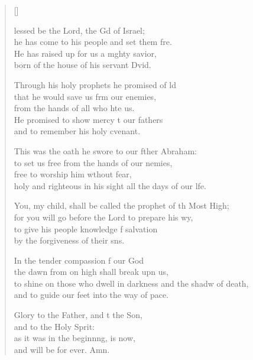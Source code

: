 \settowidth{\versewidth}{to shine on those who dwell in darkness and the shadow of death, *}
\begin{verse}[\versewidth]
  \begin{patverse}
lessed be the Lord, the Gd of Israel;\Med\\
he has come to his people and set them fre.\\
He has raised up for us a m\pointup{\i}ghty savior,\Med\\
born of the house of his servant Dvid.

Through his holy prophets he promised of ld\Flex\\
that he would save us frm our enemies,\Med\\
from the hands of all who hte us.\\
He promised to show mercy t our fathers\Med\\
and to remember his holy cvenant.

This was the oath he swore to our fther Abraham:\Med\\
to set us free from the hands of our nemies,\\
free to worship him w\pointup{\i}thout fear,\Med\\
holy and righteous in his sight all the days of our l\pointup{\i}fe.

You, my child, shall be called the prophet of th Most High;\Med\\
for you will go before the Lord to prepare his wy,\\
to give his people knowledge f salvation\Med\\
by the forgiveness of their s\pointup{\i}ns.

In the tender compassion f our God\Med\\
the dawn from on high shall break upn us,\\
to shine on those who dwell in darkness and the shadw of death,\Med\\
and to guide our feet into the way of pace.

Glory to the Father, and t the Son,\Med\\
and to the Holy Sp\pointup{\i}rit:\\
as it was in the beginn\pointup{\i}ng, is now,\Med\\
and will be for ever. Amn.
  \end{patverse}
  \end{verse}
